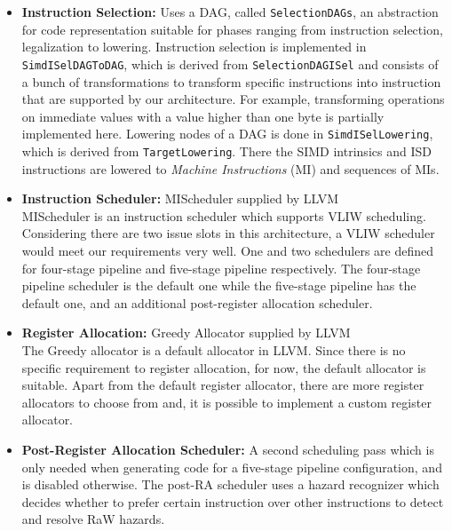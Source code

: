 \begin{itemize}
	\item \textbf{Instruction Selection:} Uses a DAG, called \texttt{SelectionDAGs}, an abstraction for code representation suitable for phases ranging from instruction selection, legalization to lowering. Instruction selection is implemented in  \texttt{SimdISelDAGToDAG}, which is derived from \texttt{SelectionDAGISel} and consists of a bunch of transformations to transform specific instructions into instruction that are supported by our architecture. For example, transforming operations on immediate values with a value higher than one byte is partially implemented here. Lowering nodes of a DAG is done in \texttt{SimdISelLowering}, which is derived from \texttt{TargetLowering}. There the SIMD intrinsics and ISD instructions are lowered to \emph{Machine Instructions} (MI) and sequences of MIs.
	\item \textbf{Instruction Scheduler:} MIScheduler supplied by LLVM\\
MIScheduler is an instruction scheduler which supports VLIW scheduling. Considering there are two issue slots in this architecture, a VLIW scheduler would meet our requirements very well. One and two schedulers are defined for four-stage pipeline and five-stage pipeline respectively. The four-stage pipeline scheduler is the default one while the five-stage pipeline has the default one, and an additional post-register allocation scheduler.
	\item \textbf{Register Allocation:} Greedy Allocator supplied by LLVM\\
	The Greedy allocator is a default allocator in LLVM. Since there is no specific requirement to register allocation, for now, the default allocator is suitable. Apart from the default register allocator, there are more register allocators to choose from and, it is possible to implement a custom register allocator.
	\item \textbf{Post-Register Allocation Scheduler:} A second scheduling pass which is only needed when generating code for a five-stage pipeline configuration, and is disabled otherwise. The post-RA scheduler uses a hazard recognizer which decides whether to prefer certain instruction over other instructions to detect and resolve RaW hazards.

\end{itemize}
